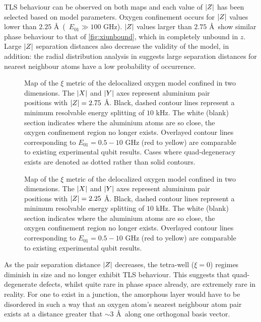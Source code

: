 TLS behaviour can be observed on both maps and each value of $\lvert Z\rvert$ has been selected based on model parameters.
Oxygen confinement occurs for $\lvert Z\rvert$ values lower than $2.25$ \AA\ (\ie\ $E_{01} \gg 100$ GHz).
$\lvert Z\rvert$ values larger than $2.75$ \AA\ show similar phase behaviour to that of \cref{fig:xiunbound}, which in completely unbound in $z$.
Large $\lvert Z\rvert$ separation distances also decrease the validity of the  model, in addition: the radial distribution analysis in  suggests large separation distances for nearest neighbour atoms have a low probability of occurrence.

\begin{figure}[htp]
  \caption[fig11]{\label{fig:xi275}Map of the $\xi$ metric of the delocalized oxygen model confined in two dimensions. The $\lvert X\rvert$ and $\lvert Y\rvert$ axes represent aluminium pair positions with $\lvert Z\rvert = 2.75$ \AA. Black, dashed contour lines represent a minimum resolvable energy splitting of $10$ kHz. The white (blank) section indicates where the aluminium atoms are so close, the oxygen confinement region no longer exists. Overlayed contour lines corresponding to $E_{01} = 0.5\!-\!10$ GHz (red to yellow) are comparable to existing experimental qubit results. Cases where quad-degeneracy exists are denoted as dotted rather than solid contours.}
\end{figure}

\begin{figure}[htp]
  \caption[fig12]{\label{fig:xi225}Map of the $\xi$ metric of the delocalized oxygen model confined in two dimensions. The $\lvert X\rvert$ and $\lvert Y\rvert$ axes represent aluminium pair positions with $\lvert Z\rvert = 2.25$ \AA. Black, dashed contour lines represent a minimum resolvable energy splitting of $10$ kHz. The white (blank) section indicates where the aluminium atoms are so close, the oxygen confinement region no longer exists. Overlayed contour lines corresponding to $E_{01} = 0.5\!-\!10$ GHz (red to yellow) are comparable to existing experimental qubit results.}
\end{figure}

As the pair separation distance $\lvert Z\rvert$ decreases, the tetra-well ($\xi=0$) regimes diminish in size and no longer exhibit TLS behaviour.
This suggests that quad-degenerate defects, whilst quite rare in phase space already, are extremely rare in reality.
For one to exist in a junction, the amorphous layer would have to be disordered in such a way that an oxygen atom's nearest neighbour atom pair exists at a distance greater that $\sim 3$ \AA\ along one orthogonal basis vector.

